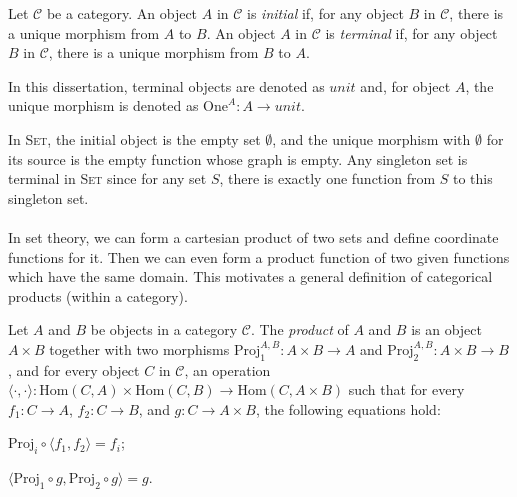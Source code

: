 \begin{definition}
\label{definition:ini_ter_obj}
Let $ \mathcal{C} $ be a category. An object $ A $ in $ \mathcal{C} $ is \emph{initial} if, for any object $ B $ in $ \mathcal{C} $, there is a unique morphism from $ A $ to $ B $. An object $ A $ in $ \mathcal{C} $ is \emph{terminal} if, for any object $ B $ in $ \mathcal{C} $, there is a unique morphism from $ B $ to $ A $.
\end{definition}

In this dissertation, terminal objects are denoted as $ unit $ and, for object $ A $, the unique
morphism is denoted as $ \text{One}^A : A \to unit $.

In \textsc{Set}, the initial object is the empty set $ \emptyset $, and the unique morphism with $ \emptyset $ for its source is the empty function whose graph is empty. Any singleton set is terminal in \textsc{Set} since for any set $ S $, there is exactly one function from $ S $ to this singleton set.
\\
\\
In set theory, we can form a cartesian product of two sets and define coordinate functions for it. Then we can even form a product function of two given functions which have the same domain. This motivates a general definition of categorical products (within a category).

\begin{definition}
\label{definition:products}
Let $ A $ and $ B $ be objects in a category $ \mathcal{C} $. The \emph{product} of $ A $ and $ B $ is an object $ A \times B $ together with two morphisms $ \text{Proj}_1^{A,B}: A \times B \to A $ and $ \text{Proj}_2^{A,B}: A \times B \to B $, and for every object $ C $ in $ \mathcal{C} $, an operation $ \langle \cdot , \cdot \rangle : \text{Hom}(C,A) \times \text{Hom}(C,B) \to \text{Hom}(C, A \times B) $ such that for every $ f_1 : C \to A $, $ f_2 : C \to B $, and $ g : C \to A \times B $, the following equations hold:
\begin{myitemize}
\item $ \text{Proj}_i \circ \langle f_1 , f_2 \rangle = f_i $;
\item $ \langle \text{Proj}_1 \circ g , \text{Proj}_2 \circ g \rangle = g $.
\end{myitemize}
\end{definition}

